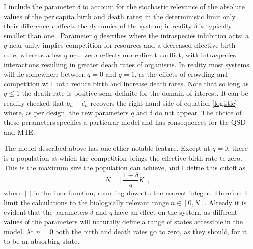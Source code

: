 I include the parameter $\delta$ to account for the stochastic relevance of the absolute values of the per capita birth and death rates; in the deterministic limit only their difference $r$ affects the dynamics of the system; in reality $\delta$ is typically smaller than one \cite{Servais1985}. 
Parameter $q$ describes where the intraspecies inhibition acts: a $q$ near unity implies competition for resources and a decreased effective birth rate, whereas a low $q$ near zero reflects more direct conflict, with intraspecies interactions resulting in greater death rates of organisms. 
In reality most systems will lie somewhere between $q=0$ and $q=1$, as the effects of crowding and competition will both reduce birth and increase death rates. 
Note that so long as $q\leq 1$ the death rate is positive semi-definite for the domain of interest. 
It can be readily checked that $b_n-d_n$ recovers the right-hand side of equation \ref{logistic} where, as per design, the new parameters $q$ and $\delta$ do not appear.
The choice of these parameters specifies a particular model and has consequences for the QSD and MTE. 

The model described above has one other notable feature. 
Except at $q=0$, there is a population at which the competition brings the effective birth rate to zero. 
This is the maximum size the population can achieve, and I define this cutoff as
\begin{equation}
N = \bigg\lfloor \frac{1+\delta}{q}K \bigg\rfloor,
\label{maxN}
\end{equation}
where $\lfloor \cdot \rfloor$ is the floor function, rounding down to the nearest integer. 
Therefore I limit the calculations to the biologically relevant range $n\in[0,N]$. %
Already it is evident that the parameters $\delta$ and $q$ have an effect on the system, as different values of the parameters will naturally define a range of states accessible in the model. 
At $n=0$ both the birth and death rates go to zero, as they should, for it to be an absorbing state. %


